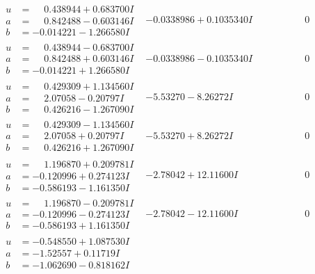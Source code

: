 \documentclass[1p]{elsarticle_modified}
\theoremstyle{definition}
\begin{document}
$$\begin{array}{c|c|c}
 \hline 
\begin{aligned}
u &= \phantom{-}0.438944 + 0.683700 I \\
a &= \phantom{-}0.842488 - 0.603146 I \\
b &= -0.014221 - 1.266580 I\end{aligned}
 & -0.0338986 + 0.1035340 I & \phantom{-0.000000 } 0 \\ \hline\begin{aligned}
u &= \phantom{-}0.438944 - 0.683700 I \\
a &= \phantom{-}0.842488 + 0.603146 I \\
b &= -0.014221 + 1.266580 I\end{aligned}
 & -0.0338986 - 0.1035340 I & \phantom{-0.000000 } 0 \\ \hline\begin{aligned}
u &= \phantom{-}0.429309 + 1.134560 I \\
a &= \phantom{-}2.07058 - 0.20797 I \\
b &= \phantom{-}0.426216 - 1.267090 I\end{aligned}
 & -5.53270 - 8.26272 I & \phantom{-0.000000 } 0 \\ \hline\begin{aligned}
u &= \phantom{-}0.429309 - 1.134560 I \\
a &= \phantom{-}2.07058 + 0.20797 I \\
b &= \phantom{-}0.426216 + 1.267090 I\end{aligned}
 & -5.53270 + 8.26272 I & \phantom{-0.000000 } 0 \\ \hline\begin{aligned}
u &= \phantom{-}1.196870 + 0.209781 I \\
a &= -0.120996 + 0.274123 I \\
b &= -0.586193 - 1.161350 I\end{aligned}
 & -2.78042 + 12.11600 I & \phantom{-0.000000 } 0 \\ \hline\begin{aligned}
u &= \phantom{-}1.196870 - 0.209781 I \\
a &= -0.120996 - 0.274123 I \\
b &= -0.586193 + 1.161350 I\end{aligned}
 & -2.78042 - 12.11600 I & \phantom{-0.000000 } 0 \\ \hline\begin{aligned}
u &= -0.548550 + 1.087530 I \\
a &= -1.52557 + 0.11719 I \\
b &= -1.062690 - 0.818162 I\end{aligned}

\end{array}$$
\end{document}
